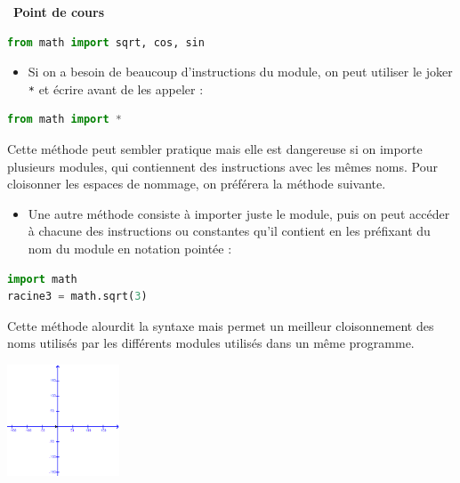 \documentclass[
  11pt,
]{article}
\newcommand{\passthrough}[1]{#1}
\providecommand{\tightlist}{%
  \setlength{\itemsep}{0pt}\setlength{\parskip}{0pt}}
\newcounter{cours}
\newenvironment{cours}[1]
{\par \medskip   \addtocounter{cours}{1} \noindent  
\begin{bclogo}[arrondi =0.1,  ombre = true, barre=none, logo=\bcbook, marge=4]{~\textbf{Point de cours} \textbf{\thecours} {\itshape #1} }  \par}
{
\end{bclogo}
 \par \bigskip }
\newcounter{prog}
\begin{document}
\begin{cours}{}
\begin{lstlisting}[language=Python]
from math import sqrt, cos, sin
\end{lstlisting}

\begin{itemize}
\tightlist
\item
  Si on a besoin de beaucoup d'instructions du module, on peut utiliser
  le joker \passthrough{\lstinline!*!} et écrire avant de les appeler :
\end{itemize}

\begin{lstlisting}[language=Python]
from math import *
\end{lstlisting}

Cette méthode peut sembler pratique mais elle est dangereuse si on
importe plusieurs modules, qui contiennent des instructions avec les
mêmes noms. Pour cloisonner les espaces de nommage, on préférera la
méthode suivante.

\begin{itemize}
\tightlist
\item
  Une autre méthode consiste à importer juste le module, puis on peut
  accéder à chacune des instructions ou constantes qu'il contient en les
  préfixant du nom du module en notation pointée :
\end{itemize}

\begin{lstlisting}[language=Python]
import math
racine3 = math.sqrt(3)
\end{lstlisting}

Cette méthode alourdit la syntaxe mais permet un meilleur cloisonnement
des noms utilisés par les différents modules utilisés dans un même
programme.

\end{cours}

\begin{center}{}

\includegraphics[width=0.25\textwidth,height=\textheight]{images/Repere_Turtle.png}\\

\end{center}
\end{document}
